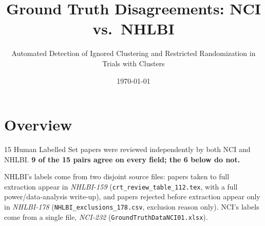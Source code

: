 \documentclass[11pt]{article}
\title{Ground Truth Disagreements: NCI vs.\ NHLBI}
\author{Automated Detection of Ignored Clustering and Restricted Randomization in Trials with Clusters}
\date{\today}
\begin{document}
\maketitle

\section{Overview}

15 Human Labelled Set papers were reviewed independently by both NCI and NHLBI. 
\textbf{9 of the 15 pairs agree on every field; the 6 below do not.}

NHLBI's labels come from two disjoint source files: papers taken to full extraction appear in
\emph{NHLBI-159} (\texttt{crt\_review\_table\_112.tex}, with a full power/data-analysis
write-up), and papers rejected before extraction appear only in \emph{NHLBI-178}
(\texttt{NHLBI\_exclusions\_178.csv}, exclusion reason only). NCI's labels come from a single
file, \emph{NCI-232} (\texttt{GroundTruthDataNCI01.xlsx}).
\end{document}
